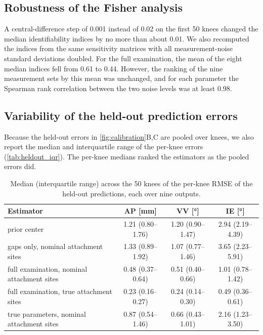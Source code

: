 \subsection*{Robustness of the Fisher analysis}

A central-difference step of 0.001 instead of 0.02 on the first 50 knees changed the median identifiability indices by no more than about 0.01.
We also recomputed the indices from the same sensitivity matrices with all measurement-noise standard deviations doubled.
For the full examination, the mean of the eight median indices fell from 0.61 to 0.44.
However, the ranking of the nine measurement sets by this mean was unchanged, and for each parameter the Spearman rank correlation between the two noise levels was at least 0.98.

\subsection*{Variability of the held-out prediction errors}

Because the held-out errors in \autoref{fig:calibration}B,C are pooled over knees, we also report the median and interquartile range of the per-knee errors (\autoref{tab:heldout_iqr}).
The per-knee medians ranked the estimators as the pooled errors did.

\begin{table}[H]
\centering
\caption{Median (interquartile range) across the 50 knees of the per-knee RMSE of the held-out predictions, each over nine outputs.}
\label{tab:heldout_iqr}
\begin{tabular}{lccc}
\toprule
Estimator & AP [\si{\milli\meter}] & VV [\si{\degree}] & IE [\si{\degree}] \\
\midrule
prior center & 1.21 (0.80--1.76) & 1.20 (0.90--1.47) & 2.94 (2.19--4.39)\\
gaps only, nominal attachment sites & 1.33 (0.89--1.92) & 1.07 (0.77--1.46) & 3.65 (2.23--5.91)\\
full examination, nominal attachment sites & 0.48 (0.37--0.64) & 0.51 (0.40--0.66) & 1.01 (0.78--1.42)\\
full examination, true attachment sites & 0.23 (0.16--0.27) & 0.24 (0.14--0.30) & 0.49 (0.36--0.61)\\
true parameters, nominal attachment sites & 0.87 (0.54--1.46) & 0.66 (0.43--1.01) & 2.16 (1.23--3.50)\\
\bottomrule
\end{tabular}
\end{table}

